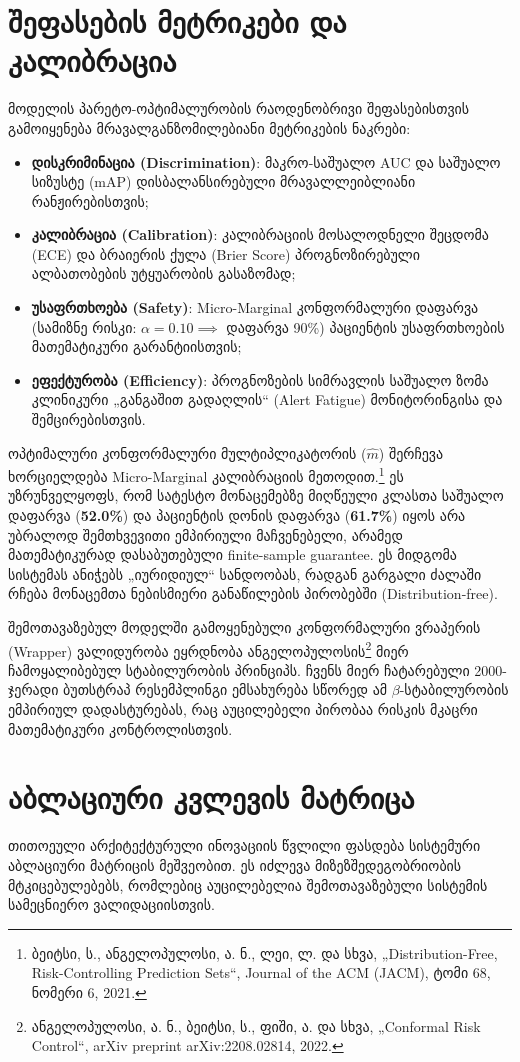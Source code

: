 \documentclass[12pt,a4paper,oneside]{report}
\begin{document}
\section{შეფასების მეტრიკები და კალიბრაცია}
მოდელის პარეტო-ოპტიმალურობის რაოდენობრივი შეფასებისთვის გამოიყენება მრავალგანზომილებიანი მეტრიკების ნაკრები:
\begin{itemize}
    \item \textbf{დისკრიმინაცია (Discrimination)}: მაკრო-საშუალო AUC და საშუალო სიზუსტე (mAP) დისბალანსირებული მრავალლეიბლიანი რანჟირებისთვის;
    \item \textbf{კალიბრაცია (Calibration)}: კალიბრაციის მოსალოდნელი შეცდომა (ECE) და ბრაიერის ქულა (Brier Score) პროგნოზირებული ალბათობების უტყუარობის გასაზომად;
    \item \textbf{უსაფრთხოება (Safety)}: Micro-Marginal კონფორმალური დაფარვა (სამიზნე რისკი: $\alpha = 0.10 \implies$ დაფარვა 90\%) პაციენტის უსაფრთხოების მათემატიკური გარანტიისთვის;
    \item \textbf{ეფექტურობა (Efficiency)}: პროგნოზების სიმრავლის საშუალო ზომა კლინიკური „განგაშით გადაღლის“ (Alert Fatigue) მონიტორინგისა და შემცირებისთვის.
\end{itemize}

ოპტიმალური კონფორმალური მულტიპლიკატორის ($\hat{m}$) შერჩევა ხორციელდება Micro-Marginal კალიბრაციის მეთოდით.\footnote{ბეიტსი, ს., ანგელოპულოსი, ა. ნ., ლეი, ლ. და სხვა, „Distribution-Free, Risk-Controlling Prediction Sets“, Journal of the ACM (JACM), ტომი 68, ნომერი 6, 2021.} ეს უზრუნველყოფს, რომ სატესტო მონაცემებზე მიღწეული კლასთა საშუალო დაფარვა (\textbf{52.0\%}) და პაციენტის დონის დაფარვა (\textbf{61.7\%}) იყოს არა უბრალოდ შემთხვევითი ემპირიული მაჩვენებელი, არამედ მათემატიკურად დასაბუთებული finite-sample guarantee. ეს მიდგომა სისტემას ანიჭებს „იურიდიულ“ სანდოობას, რადგან გარგალი ძალაში რჩება მონაცემთა ნებისმიერი განაწილების პირობებში (Distribution-free).

შემოთავაზებულ მოდელში გამოყენებული კონფორმალური ვრაპერის (Wrapper) ვალიდურობა ეყრდნობა ანგელოპულოსის\footnote{ანგელოპულოსი, ა. ნ., ბეიტსი, ს., ფიში, ა. და სხვა, „Conformal Risk Control“, arXiv preprint arXiv:2208.02814, 2022.} მიერ ჩამოყალიბებულ სტაბილურობის პრინციპს. ჩვენს მიერ ჩატარებული 2000-ჯერადი ბუთსტრაპ რესემპლინგი ემსახურება სწორედ ამ $\beta$-სტაბილურობის ემპირიულ დადასტურებას, რაც აუცილებელი პირობაა რისკის მკაცრი მათემატიკური კონტროლისთვის.

\section{აბლაციური კვლევის მატრიცა}
თითოეული არქიტექტურული ინოვაციის წვლილი ფასდება სისტემური აბლაციური მატრიცის მეშვეობით. ეს იძლევა მიზეზშედეგობრიობის მტკიცებულებებს, რომლებიც აუცილებელია შემოთავაზებული სისტემის სამეცნიერო ვალიდაციისთვის.
\end{document}

